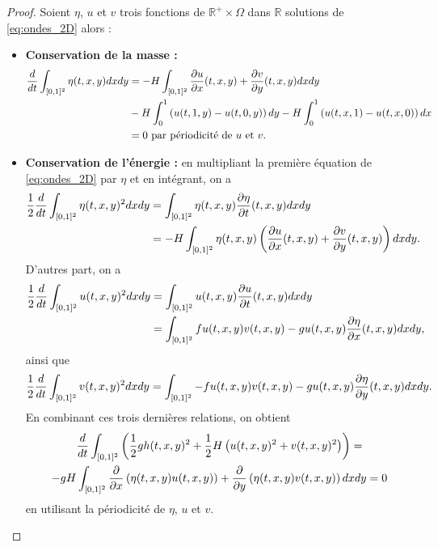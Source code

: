 \begin{proof}
Soient $\eta$, $u$ et $v$ trois fonctions de $\mathbb{R}^+ \times \Omega$ dans $\mathbb{R}$ solutions de \eqref{eq:ondes_2D} alors :
\begin{itemize}
\item \textbf{Conservation de la masse :}
\begin{align*}
\dfrac{d}{dt} \displaystyle\int_{[0,1]^2} \eta(t,x,y)dxdy & = - H \displaystyle\int_{[0,1]^2} \dfrac{\partial u}{\partial x}(t,x,y) + \dfrac{\partial v}{\partial y}(t,x,y) dx dy \\
	& - H \displaystyle\int_0^1 \left( u(t,1,y) - u(t,0,y) \right)dy  - H \displaystyle\int_0^1 \left( u(t,x,1) - u(t,x,0) \right)dx \\
	& = 0 \text{ par périodicité de } u \text{ et } v. 
\end{align*}

\item \textbf{Conservation de l'énergie :} en multipliant la première équation de \eqref{eq:ondes_2D} par $\eta$ et en intégrant, on a 
\begin{align*}
\dfrac{1}{2} \dfrac{d}{dt} \displaystyle\int_{[0,1]^2} \eta(t,x,y)^2 dx dy & = \displaystyle\int_{[0,1]^2} \eta(t,x,y) \dfrac{\partial \eta}{\partial t}(t,x,y) dx dy \\
	& = - H \displaystyle\int_{[0,1]^2} \eta(t,x,y) \left( \dfrac{\partial u}{\partial x}(t,x,y) + \dfrac{\partial v}{\partial y}(t,x,y) \right) dx dy.
\end{align*}
D'autres part, on a 
\begin{align*}
\dfrac{1}{2} \dfrac{d}{dt} \displaystyle\int_{[0,1]^2} u(t,x,y)^2 dx dy & = \displaystyle\int_{[0,1]^2} u(t,x,y) \dfrac{\partial u}{\partial t}(t,x,y) dx dy \\
& = \displaystyle\int_{[0,1]^2} f u(t,x,y) v(t,x,y) - g u(t,x,y) \dfrac{\partial \eta}{\partial x}(t,x,y) dx dy,
\end{align*}
ainsi que 
\begin{equation*}
\dfrac{1}{2} \dfrac{d}{dt} \displaystyle\int_{[0,1]^2} v(t,x,y)^2 dx dy =  \displaystyle\int_{[0,1]^2}  - f u(t,x,y) v(t,x,y) - g u(t,x,y) \dfrac{\partial \eta}{\partial y}(t,x,y) dx dy.
\end{equation*}
En combinant ces trois dernières relations, on obtient
\begin{multline*}
\dfrac{d}{dt} \displaystyle\int_{[0,1]^2} \left( \dfrac{1}{2} g h(t,x,y)^2 + \dfrac{1}{2} H \left( u(t,x,y)^2 + v(t,x,y)^2 \right) \right) = \\
- g H \displaystyle\int_{[0,1]^2} \dfrac{\partial}{\partial x} \left( \eta(t,x,y) u (t,x,y) \right) +  \dfrac{\partial}{\partial y} \left( \eta(t,x,y) v (t,x,y) \right) dx dy
= 0
\end{multline*}
en utilisant la périodicité de $\eta$, $u$ et $v$.
\end{itemize}
\end{proof}







